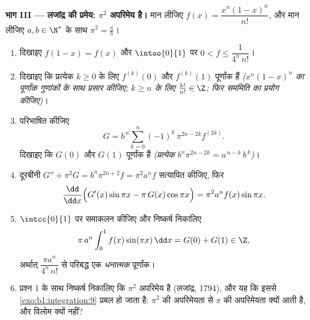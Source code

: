 \begin{problem}
\medskip \noindent\textbf{भाग III --- लजांद्र की प्रमेय: $\pi^2$ अपरिमेय
है।} मान लीजिए $f(x) = \dfrac{x^n (1 - x)^n}{n!}$, और मान लीजिए $a, b \in
\N^*$ के साथ $\pi^2 = \frac ab$।
\begin{enumerate}[resume]
  \item दिखाइए $f(1 - x) = f(x)$ और $\intoo{0}{1}$ पर $0 < f \leq
  \dfrac{1}{4^n\,n!}$।
  \item दिखाइए कि प्रत्येक $k \geq 0$ के लिए $f^{(k)}(0)$ और $f^{(k)}(1)$
  पूर्णांक हैं \emph{($x^n(1-x)^n$ का पूर्णांक गुणांकों के साथ प्रसार कीजिए;
  $k \geq n$ के लिए $\frac{k!}{n!} \in \Z$; फिर सममिति का प्रयोग कीजिए)}।
  \item परिभाषित कीजिए
        \[
        G = b^{\,n} \sum_{k=0}^{n} (-1)^k\,
        \pi^{2n - 2k} f^{(2k)} .
        \]
        दिखाइए कि $G(0)$ और $G(1)$ पूर्णांक हैं \emph{(प्रत्येक $b^n
        \pi^{2n-2k} = a^{\,n-k}\,b^{\,k}$)}।
  \item दूरबीनी $G'' + \pi^2 G = b^n \pi^{2n+2} f = \pi^2 a^n f$ सत्यापित
  कीजिए, फिर
        \[
        \frac{\dd}{\dd x}\Bigl(G'(x)\sin \pi x - \pi\,G(x)\cos
        \pi x\Bigr) = \pi^2 a^n f(x)\sin \pi x .
        \]
  \item $\intcc{0}{1}$ पर समाकलन कीजिए और निष्कर्ष निकालिए
        \[
        \pi\,a^n \int_0^1 f(x)\sin(\pi x)\,\dd x = G(0) + G(1)
        \in \Z ,
        \]
        अर्थात् $\dfrac{\pi a^n}{4^n\,n!}$ से परिबद्ध एक \emph{धनात्मक}
        पूर्णांक।
  \item प्रश्न 1 के साथ निष्कर्ष निकालिए कि $\pi^2$ अपरिमेय है (लजांद्र,
  1794), और यह कि इससे \cref{exo:b1:integration:9} प्रबल हो जाता है: $\pi^2$
  की अपरिमेयता से $\pi$ की अपरिमेयता क्यों आती है, और विलोम क्यों नहीं?
\end{enumerate}


\end{problem}
